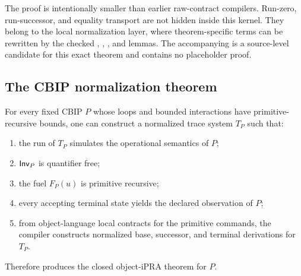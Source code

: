 The proof is intentionally smaller than earlier raw-contract compilers.  Run-zero, run-successor, and equality transport are not hidden inside this kernel.  They belong to the local normalization layer, where theorem-specific terms can be rewritten by the checked , , , and  lemmas.  The accompanying  is a source-level candidate for this exact theorem and contains no placeholder proof.

\subsection{The CBIP normalization theorem}

\begin{theorem}\label{thm:normalization}
For every fixed CBIP \(P\) whose loops and bounded interactions have primitive-recursive bounds, one can construct a normalized trace system \(T_P\) such that:
\begin{enumerate}
\item the run of \(T_P\) simulates the operational semantics of \(P\);
\item \(\mathsf{Inv}_P\) is quantifier free;
\item the fuel \(F_P(u)\) is primitive recursive;
\item every accepting terminal state yields the declared observation of \(P\);
\item from object-language local contracts for the primitive commands, the compiler constructs normalized base, successor, and terminal derivations for \(T_P\).
\end{enumerate}
Therefore  produces the closed object-iPRA theorem for \(P\).
\end{theorem}

